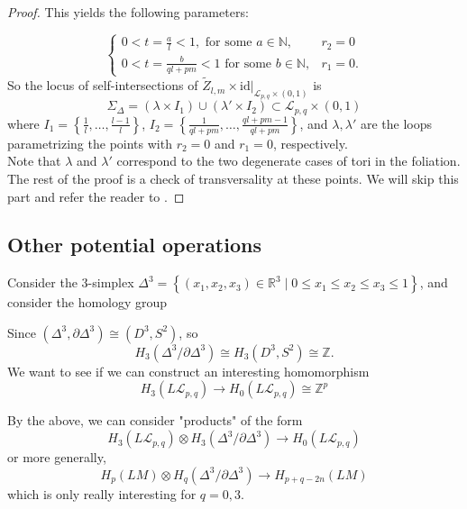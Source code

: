 \documentclass[reqno]{amsart}
\theoremstyle{definition}
\theoremstyle{remark}
\newcommand{\id}{{\mathrm{id}}}
\begin{document}
\begin{proof}
     This yields the following parameters:

     \[
     \begin{cases}
         0 < t = \frac{a}{l} < 1, \text{ for some } a \in \mathbb{N} ,& 
         r_2 = 0\\
         0 < t = \frac{b}{ql+pm} < 1 \text{ for some } b \in \mathbb{N} ,&
         r_1 = 0.
     \end{cases}
     \] 
     So the locus of self-intersections of 
     $\tilde{Z}_{l,m} \times \id|_{\mathcal{L}_{p,q} \times (0,1)}$ is
     \[
     \Sigma_{\Delta} = 
     \left( \lambda \times I_1 \right) \cup 
     \left( \lambda'\times I_2 \right) \subset \mathcal{L}_{p,q} \times 
     (0,1)
     \] 
     where $I_1 = \left\{ \frac{1}{l}, \ldots,
     \frac{l-1}{l}\right\} $, 
     $I_2 = \left\{ \frac{1}{ql+pm}, \ldots, \frac{ql+pm-1}{ql+pm} \right\} $,
     and $\lambda, \lambda'$ are the loops parametrizing the
     points with $r_2 = 0$ and $r_1 = 0$, respectively.\\
     Note that $\lambda$ and $\lambda'$ correspond to the
     two degenerate cases of tori in the foliation.\\
     \linebreak
     The rest of the proof is a check of transversality at these
     points. We will skip this part and refer the reader to
     \cite{Naef-Rivera-Wahl}.






\end{proof}




\newpage

\subsection{Other potential operations}


Consider the $3$-simplex
$\Delta^3 = \left\{ \left( x_1,x_2,x_3 \right) \in \mathbb{R}^3  \mid 
0 \le x_1 \le x_2 \le x_3 \le 1\right\} $, and
consider the homology group

Since $\left( \Delta^3, \partial \Delta^3 \right) 
\cong \left( D^3, S^2 \right) $,
so
\[
H_3 \left( \Delta^3 / \partial \Delta^3 \right) \cong
H_3 \left( D^3, S^2 \right) \cong
\mathbb{Z}.
\] 
We want to see if we can construct an interesting
homomorphism
\[
H_3 \left( L \mathcal{L}_{p,q} \right) \to 
H_0 \left( L \mathcal{L}_{p,q} \right) 
\cong \mathbb{Z}^{p}
\] 

By the above, we can consider "products" of the form
\[
H_3 \left( L \mathcal{L}_{p,q} \right) \otimes
H_3 \left( \Delta^3 / \partial \Delta^3 \right) 
\to H_0 \left( L \mathcal{L}_{p,q} \right) 
\] 
or more generally,
\[
H_p \left( LM \right) \otimes
H_q \left( \Delta^3 / \partial \Delta^3 \right) \to 
H_{p+q-2n}\left( LM \right) 
\] 
which is only really interesting for
$q = 0,3$.\\
\linebreak
\end{document}

